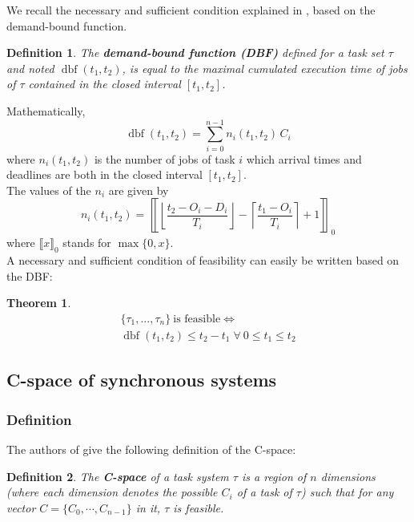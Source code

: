 \documentclass[times, 10pt,twocolumn, a4paper]{article}
\newtheorem{theorem}{Theorem}
\newtheorem{definition}{Definition}
\newcommand{\dbf}[1]{\operatorname{dbf}(#1)}
\begin{document}
	We recall the necessary and sufficient condition explained in \cite{baruah1999generalized, baruah1990algorithms}, based on the demand-bound function.

	\begin{definition}
		The \textbf{demand-bound function (DBF)}
		defined for a task set $\tau$ and noted $\dbf{t_1, t_2}$, is equal to
		the maximal cumulated execution time of jobs of $\tau$ contained in the
		closed interval $[t_1, t_2]$.
	\end{definition}

	Mathematically,
	\[
		\dbf{t_1, t_2} = \sum_{i=0}^{n-1} n_i(t_1, t_2) \, C_i
	\]
	where $n_i(t_1, t_2)$ is the number of jobs of task $i$ which arrival times
	and deadlines are both in the closed interval $[t_1, t_2]$.\\

	The values of the $n_i$ are given by
	\[
		n_i(t_1, t_2) =
		\left\llbracket
			\left\lfloor
				\frac{t_2 - O_i - D_i}{T_i}
			\right\rfloor -
			\left\lceil
				\frac{t_1 - O_i}{T_i}
			\right\rceil + 1
		\right\rrbracket_0
	\]
	where $\llbracket x \rrbracket_0$ stands for $\max \{ 0, x \}$.\\

	A necessary and sufficient condition of feasibility can easily be written
	based on the DBF:

	\begin{theorem}
	\[
		\begin{array}{c}
			\{\tau_1, ..., \tau_n\} \: \text{is feasible}  \iff \\
			\dbf{t_1, t_2} \leq t_2 - t_1 \; \forall \: 0 \leq t_1 \leq t_2
		\end{array}
	\]
	\end{theorem}

	\subsection{C-space of synchronous systems}

		\subsubsection{Definition}

			The authors of \cite{george2009characterization} give the following definition of the C-space:
			\begin{definition}
				The \textbf{C-space} of a task system $\tau$ is a region of $n$ dimensions (where each dimension denotes the possible $C_i$ of a task of $\tau$) such that for any vector $C = \{ C_0, \cdots, C_{n-1}\}$ in it, $\tau$ is feasible.
			\end{definition}
\end{document}
